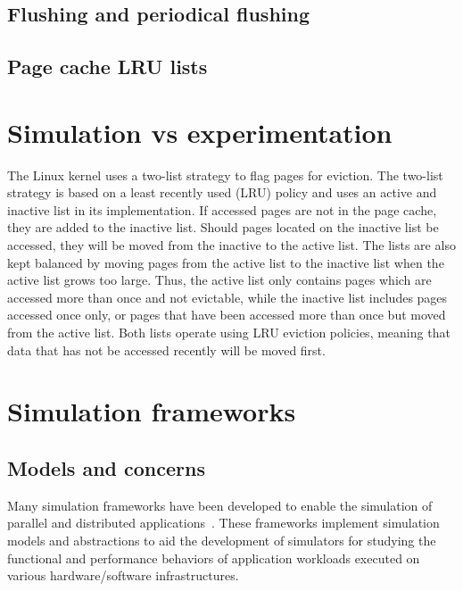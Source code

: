\subsection{Flushing and periodical flushing}

\subsection{Page cache LRU lists}

\section{Simulation vs experimentation}

The Linux kernel uses a two-list strategy to flag pages for eviction.
The two-list strategy is based on a least recently used (LRU) policy
and uses an active and inactive list in its implementation.
If accessed pages are not in the page cache, they are added to the inactive list.
Should pages located on the inactive list be accessed, they will be moved from
the inactive to the active list.
The lists are also kept balanced by moving pages from the active list
to the inactive list when the active list grows too large.
Thus, the active list only contains pages which are accessed more than once
and not evictable, while the inactive list includes pages accessed once only,
or pages that have been accessed more than once but moved from the active list.
Both lists operate using LRU eviction policies, meaning that data that has
not be accessed recently will be moved first.

\section{Simulation frameworks}

\subsection{Models and concerns}

Many simulation frameworks have been developed to enable the
simulation of parallel and distributed
applications~\cite{optorsim, gridsim, groudsim, cloudsim,
nunez2012simcan,nunez2012icancloud, mdcsim, dissect_cf,
cloudnetsimplusplus, fognetsimplusplus, casanova2014simgrid,
ROSS, casanova2020fgcs}. These frameworks implement simulation
models and abstractions to aid the development of simulators
for studying the functional and performance behaviors of
application workloads executed on various hardware/software
infrastructures. 


